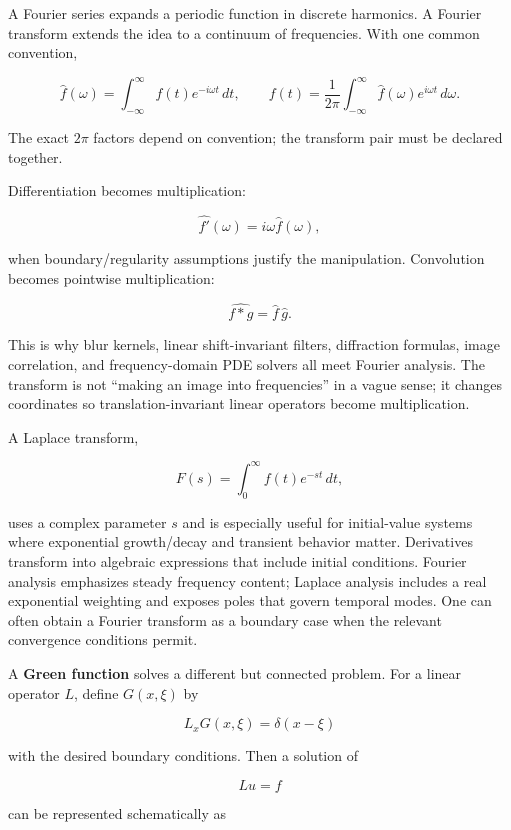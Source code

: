 \hypertarget{02-foundations-ii-ch025-fourier-laplace-and-green-methods-answer-different-versions-of-invert-this-linear-system}{}

A Fourier series expands a periodic function in discrete harmonics. A Fourier transform extends the idea to a continuum of frequencies. With one common convention,

\[
\hat f(\omega)
=
\int_{-\infty}^{\infty}
f(t)e^{-i\omega t}\,dt,
\qquad
f(t)
=
\frac{1}{2\pi}
\int_{-\infty}^{\infty}
\hat f(\omega)e^{i\omega t}\,d\omega.
\]

The exact \(2\pi\) factors depend on convention; the transform pair must be declared together.

Differentiation becomes multiplication:

\[
\widehat{f'}(\omega)=i\omega\hat f(\omega),
\]

when boundary/regularity assumptions justify the manipulation. Convolution becomes pointwise multiplication:

\[
\widehat{f*g}
=
\hat f\,\hat g.
\]

This is why blur kernels, linear shift-invariant filters, diffraction formulas, image correlation, and frequency-domain PDE solvers all meet Fourier analysis. The transform is not ``making an image into frequencies'' in a vague sense; it changes coordinates so translation-invariant linear operators become multiplication.

A Laplace transform,

\[
F(s)
=
\int_0^\infty
f(t)e^{-st}\,dt,
\]

uses a complex parameter \(s\) and is especially useful for initial-value systems where exponential growth/decay and transient behavior matter. Derivatives transform into algebraic expressions that include initial conditions. Fourier analysis emphasizes steady frequency content; Laplace analysis includes a real exponential weighting and exposes poles that govern temporal modes. One can often obtain a Fourier transform as a boundary case when the relevant convergence conditions permit.

A \textbf{Green function} solves a different but connected problem. For a linear operator \(L\), define \(G(x,\xi)\) by

\[
L_x G(x,\xi)=\delta(x-\xi)
\]

with the desired boundary conditions. Then a solution of

\[
L u=f
\]

can be represented schematically as

